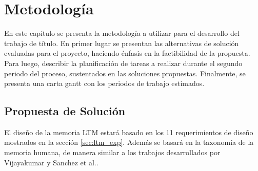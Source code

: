 
\chapter{Metodolog\'ia}

En este cap\'itulo se presenta la metodolog\'ia a utilizar para el desarrollo del trabajo de t\'itulo. En primer lugar se presentan las alternativas de soluci\'on evaluadas para el proyecto, haciendo \'enfasis en la factibilidad de la propuesta. Para luego, describir la planificaci\'on de tareas a realizar durante el segundo periodo del proceso, sustentados en las soluciones propuestas. Finalmente, se presenta una carta gantt con los periodos de trabajo estimados.


\section{Propuesta de Soluci\'on}

%


El dise\~no de la memoria LTM estar\'a basado en los 11 requerimientos de dise\~no mostrados en la secci\'on \ref{sec:ltm_exp}. Adem\'as se basar\'a en la taxonom\'ia de la memoria humana, de manera similar a los trabajos desarrollados por Vijayakumar\cite{Vijayakumar2014} y Sanchez et al.\cite{Sanchez:2015}.






